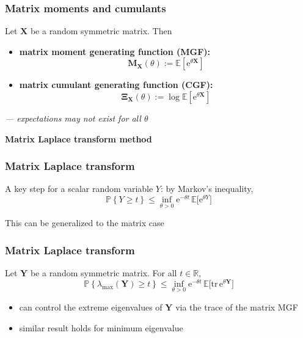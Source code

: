 \documentclass[compress,
mathserif,wide,%
]{beamer}
\begin{document}
\begin{frame}
\frametitle{Matrix moments and cumulants}  

	Let $\bm{X}$ be a random symmetric matrix. Then

	\begin{itemize}
		\item {\bf matrix moment generating function (MGF):} 
		\[
			\bm{M}_{\bm{X}}(\theta) := \mathbb{E}[\mathrm{e}^{\theta\bm{X}}]
		\]
	\item {\bf matrix cumulant generating function (CGF):} 
		\[
			\bm{\Xi}_{\bm{X}}(\theta) := \log \mathbb{E}[\mathrm{e}^{\theta\bm{X}}]
		\]
		

	
	\end{itemize}

{\hfill \em --- expectations may not exist for all $\theta$}
\end{frame}




\begin{frame}[plain]

\vfill
\begin{center}
  {\Large\bf Matrix Laplace transform method}
\end{center}

\vfill

\end{frame}





\begin{frame}
\frametitle{Matrix Laplace transform}  

A key step for a scalar random variable $Y$: by Markov's inequality,
	\[
		\mathbb{P}\left\{ Y \geq t\right\} \leq \inf_{\theta>0} \mathrm{e}^{-\theta t} \,\mathbb{E}\big[\mathrm{e}^{\theta {Y}}\big]
	\]


\bigskip
\bigskip

This can be generalized to the matrix case

\end{frame}


\begin{frame}
\frametitle{Matrix Laplace transform} 


\begin{lemma}\label{lem:matrix-Laplace}
Let $\bm{Y}$ be a random symmetric matrix. For all $t\in\mathbb{R}$,
%
\[
	\mathbb{P}\left\{ \lambda_{\max}(\bm{Y}) \geq t\right\} \leq\inf_{\theta>0} \mathrm{e}^{-\theta t} \,\mathbb{E}\big[\mathrm{tr}\,\mathrm{e}^{\theta\bm{Y}}\big]
\]
%
\end{lemma}

\begin{itemize}
	\item can control the extreme eigenvalues of $\bm{Y}$ via the trace of the matrix MGF
	\item similar result holds for minimum eigenvalue
\end{itemize}

\end{frame}
\end{document}
